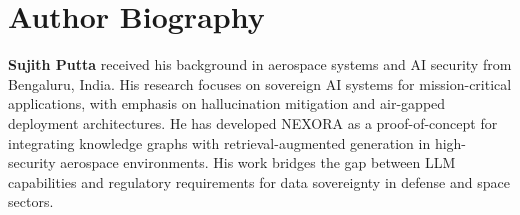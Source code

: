 \documentclass[journal,12pt,twocolumn]{IEEEtran}
\begin{document}
\section*{Author Biography}

\textbf{Sujith Putta} received his background in aerospace systems and AI security from Bengaluru, India. His research focuses on sovereign AI systems for mission-critical applications, with emphasis on hallucination mitigation and air-gapped deployment architectures. He has developed NEXORA as a proof-of-concept for integrating knowledge graphs with retrieval-augmented generation in high-security aerospace environments. His work bridges the gap between LLM capabilities and regulatory requirements for data sovereignty in defense and space sectors.
\end{document}
